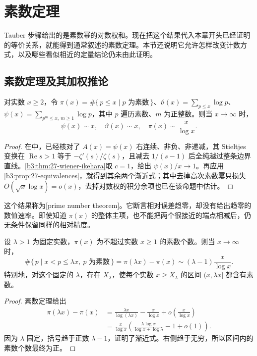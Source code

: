 \section{素数定理}
\label{b3:sec:2705}

Tauber 步骤给出的是素数幂的对数权和。现在把这个结果代入本章开头已经证明的等价关系，就能得到通常叙述的素数定理。本节还说明它允许怎样改变计数方式，以及哪些看似相近的定量结论仍未由此证明。

\subsection{素数定理及其加权推论}
\label{b3:subsec:270501}

\begin{theorem}[素数定理]\label{b3:thm:27-pnt}
对实数 \(x\ge2\)，令 \(\pi(x)=\#\{\,p\le x\mid p\text{ 为素数}\,\}\)、\(\vartheta(x)=\sum_{p\le x}\log p\)、\(\psi(x)=\sum_{p^m\le x,\ m\ge1}\log p\)，其中 \(p\) 遍历素数、\(m\) 为正整数。则当 \(x\to\infty\) 时，
\[
 \psi(x)\sim x,
 \quad \vartheta(x)\sim x,
 \quad \pi(x)\sim\frac{x}{\log x}.
\]
\end{theorem}
\begin{proof}
在中，已经核对了 \(A(x)=\psi(x)\) 右连续、非负、非递减，其 Stieltjes 变换在 \(\operatorname{Re}s>1\) 等于 \(-\zeta'(s)/\zeta(s)\)，且减去 \(1/(s-1)\) 后全纯越过整条边界直线。\cref{b3:thm:27-wiener-ikehara}取 \(c=1\)，给出 \(\psi(x)/x\to1\)。再应用\cref{b3:prop:27-equivalences}，就得到其余两个渐近式；其中去掉高次素数幂只损失 \(O(\sqrt x\log x)=o(x)\)，去掉对数权的积分余项也已在该命题中估计。
\end{proof}

这个结果称为[prime number theorem]。它断言相对误差趋零，却没有给出趋零的数值速率。即使知道 \(\pi(x)\) 的整体主项，也不能把两个很接近的端点相减后，仍无条件保留同样的相对精度。

\begin{corollary}[固定比例区间内的素数]
\label{b3:cor:27-fixed-ratio-interval}
设 \(\lambda>1\) 为固定实数，\(\pi(x)\) 为不超过实数 \(x\ge1\) 的素数个数。则当 \(x\to\infty\) 时，
\[
 \#\{\,p\mid x<p\le\lambda x,\ p\text{ 为素数}\,\}
 =\pi(\lambda x)-\pi(x)
 \sim(\lambda-1)\frac{x}{\log x}.
\]
特别地，对这个固定的 \(\lambda\)，存在 \(X_\lambda\)，使每个实数 \(x\ge X_\lambda\) 的区间 \((x,\lambda x]\) 都含有素数。
\end{corollary}
\begin{proof}
素数定理给出
\[
 \begin{aligned}
 \pi(\lambda x)-\pi(x)
 &=\frac{\lambda x}{\log(\lambda x)}-\frac{x}{\log x}
      +o\!\left(\frac{x}{\log x}\right)\\
 &=\frac{x}{\log x}
    \left(\frac{\lambda\log x}{\log x+\log\lambda}-1+o(1)\right).
 \end{aligned}
\]
因为 \(\lambda\) 固定，括号趋于正数 \(\lambda-1\)，证明了渐近式。右侧趋于无穷，所以区间内的素数个数最终为正。
\end{proof}

